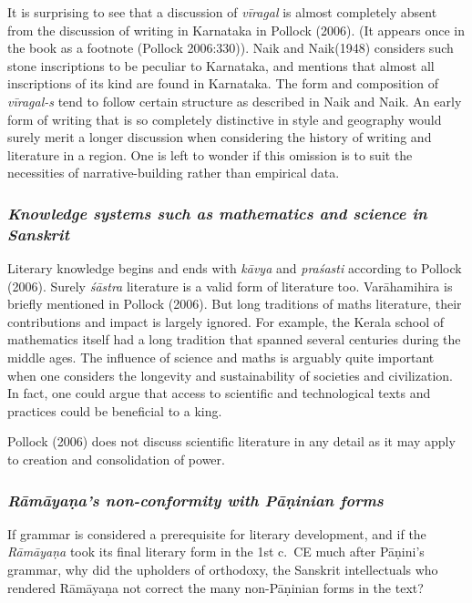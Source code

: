 It is surprising to see that a discussion of {\sl vīragal} is almost completely absent from the discussion of writing in Karnataka in Pollock (2006). (It appears once in the book as a footnote (Pollock 2006:330)). Naik and Naik(1948) considers such stone inscriptions to be peculiar to Karnataka, and mentions that almost all inscriptions of its kind are found in Karnataka. The form and composition of {\sl vīragal-s} tend to follow certain structure as described in Naik and Naik. An early form of writing that is so completely distinctive in style and geography would surely merit a longer discussion when considering the history of writing and literature in a region. One is left to wonder if this omission is to suit the necessities of narrative-building rather than empirical data. 
\vskip -10pt

\subsubsection{{\sl Knowledge systems such as mathematics and science in Sanskrit}}
\vskip -4pt

Literary knowledge begins and ends with {\sl kāvya} and {\sl praśasti} according to Pollock (2006). Surely {\sl śāstra} literature is a valid form of literature too. Varāha\-mihira is briefly mentioned in Pollock (2006). But long traditions of maths literature, their contributions and impact is largely ignored. For example, the Kerala school of mathematics itself had a long tradition that spanned several centuries during the middle ages. The influence of science and maths is arguably quite important when one considers the longevity and sustainability of societies and civilization. In fact, one could argue that access to scientific and technological texts and practices could be beneficial to a king. 

Pollock (2006) does not discuss scientific literature in any detail as it may apply to creation and consolidation of power. 

\subsubsection{{\sl Rāmāyaṇa’s non-conformity with Pāṇinian forms}}

If grammar is considered a prerequisite for literary development, and if the {\sl Rāmāyaṇa} took its final literary form in the 1st c.\ CE much after Pāṇini’s grammar, why did the upholders of orthodoxy, the Sanskrit intellectuals who rendered Rāmāyaṇa not correct the many non-Pāṇinian forms in the text? 

